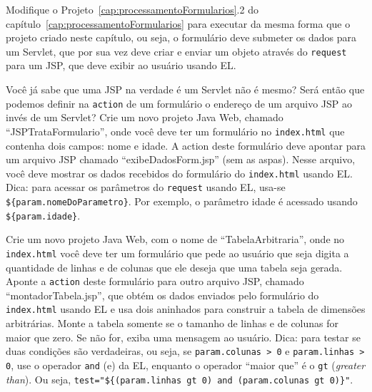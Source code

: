 \begin{projetoSemArquivo}{}{}{}
    Modifique o Projeto~\ref{cap:processamentoFormularios}.2 do capítulo~\ref{cap:processamentoFormularios} para executar da mesma forma que o projeto criado neste capítulo, ou seja, o formulário deve submeter os dados para um Servlet, que por sua vez deve criar e enviar um objeto através do \texttt{request} para um JSP, que deve exibir ao usuário usando EL.
\end{projetoSemArquivo}

\begin{projetoSemArquivo}{}{}{}
    Você já sabe que uma JSP na verdade é um Servlet não é mesmo? Será então que podemos definir na \texttt{action} de um formulário o endereço de um arquivo JSP ao invés de um Servlet? Crie um novo projeto Java Web, chamado ``JSPTrataFormulario'', onde você deve ter um formulário no \texttt{index.html} que contenha dois campos: nome e idade. A action deste formulário deve apontar para um arquivo JSP chamado ``exibeDadosForm.jsp'' (sem as aspas). Nesse arquivo, você deve mostrar os dados recebidos do formulário do \texttt{index.html} usando EL. Dica: para acessar os parâmetros do \texttt{request} usando EL, usa-se \texttt{\$\{param.nomeDoParametro\}}. Por exemplo, o parâmetro idade é acessado usando \texttt{\$\{param.idade\}}.
\end{projetoSemArquivo}

\begin{projetoSemArquivo}{}{}{}
    Crie um novo projeto Java Web, com o nome de ``TabelaArbitraria'', onde no \texttt{index.html} você deve ter um formulário que pede ao usuário que seja digita a quantidade de linhas e de colunas que ele deseja que uma tabela seja gerada. Aponte a \texttt{action} deste formulário para outro arquivo JSP, chamado ``montadorTabela.jsp'', que obtém os dados enviados pelo formulário do \texttt{index.html} usando EL e usa dois  aninhados para construir a tabela de dimensões arbitrárias. Monte a tabela somente se o tamanho de linhas e de colunas for maior que zero. Se não for, exiba uma mensagem ao usuário. Dica: para testar se duas condições são verdadeiras, ou seja, se \texttt{param.colunas > 0} e \texttt{param.linhas > 0}, use o operador \texttt{and} (e) da EL, enquanto o operador ``maior que'' é o \texttt{gt} (\textit{greater than}). Ou seja, \texttt{test="\$\{(param.linhas gt 0) and (param.colunas gt 0)\}"}.
\end{projetoSemArquivo}
